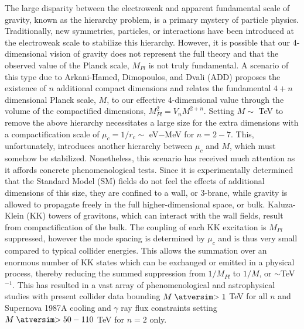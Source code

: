 The large disparity between the electroweak and apparent fundamental scale 
of gravity, known as the hierarchy problem,  is a primary mystery 
of particle physics.  Traditionally, new symmetries, particles, or interactions
have been introduced at the electroweak scale to stabilize this hierarchy.
However, it is possible that our 4-dimensional vision of gravity does not
represent the full theory and that the observed value of the Planck scale,
$M_{Pl}$ is not truly fundamental.  A scenario of this type due to Arkani-Hamed,
Dimopoulos, and Dvali\cite{nima} (ADD) proposes
the existence of $n$ additional compact dimensions and relates the
fundamental $4+n$ dimensional Planck scale, $M$, to our effective 4-dimensional
value through the volume of the compactified dimensions, $M^2_{Pl}=V_nM^{2+n}$.
Setting $M\sim$ TeV to remove the above hierarchy necessitates a large
size for the extra dimensions with a compactification scale of $\mu_c=1/r_c
\sim$ eV$-$MeV for $n=2-7$.  This, unfortunately, introduces another hierarchy
between $\mu_c$ and $M$, which must somehow be stabilized.  Nonetheless,
this scenario has received much attention as it affords concrete 
phenomenological tests.
Since it is experimentally determined that the
Standard Model (SM) fields do not feel the effects of additional dimensions of 
this size, they are confined to a wall, or 3-brane, while gravity is 
allowed to propagate freely in the full higher-dimensional space, or bulk.  
Kaluza-Klein (KK) towers of gravitons, which can interact with the wall fields, 
result from compactification of the bulk.  The coupling of each KK excitation
is $M_{Pl}$ suppressed, however the mode spacing is determined by $\mu_c$ and 
is thus very small compared to typical collider energies.  This allows the 
summation over an enormous number of KK states which can be exchanged or 
emitted in a physical process, thereby reducing the summed suppression from 
$1/M_{Pl}$ to $1/M$, or $\sim$TeV$^{-1}$. This has resulted in
a vast array of phenomenological\cite{pheno} and astrophysical\cite{astro} 
studies with present collider data bounding $M\gsim 1$ TeV for all $n$ and 
Supernova 1987A cooling and $\gamma$ ray flux constraints setting 
$M\gsim 50-110$ TeV for $n=2$ only.

